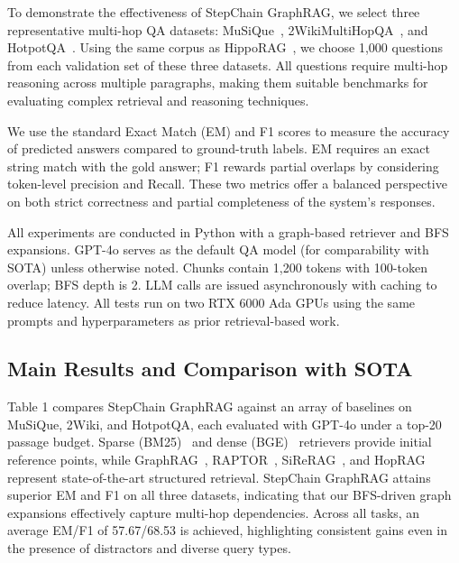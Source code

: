 \documentclass[runningheads]{llncs}
\begin{document}
To demonstrate the effectiveness of StepChain GraphRAG, we select three representative multi-hop QA datasets: MuSiQue~\cite{trivedi2022musique}, 2WikiMultiHopQA~\cite{ho2020constructing}, and HotpotQA~\cite{yang2018hotpotqa}. Using the same corpus as HippoRAG~\cite{gutierrez2024hipporag}, we choose 1,000 questions from each validation set of these three datasets. All questions require multi-hop reasoning across multiple paragraphs, making them suitable benchmarks for evaluating complex retrieval and reasoning techniques. 

We use the standard Exact Match (EM) and F1 scores to measure the accuracy of predicted answers compared to ground-truth labels. EM requires an exact string match with the gold answer; F1 rewards partial overlaps by considering token-level precision and Recall. These two metrics offer a balanced perspective on both strict correctness and partial completeness of the system's responses.

All experiments are conducted in Python with a graph-based retriever and BFS expansions. GPT-4o serves as the default QA model (for comparability with SOTA) unless otherwise noted. Chunks contain 1,200 tokens with 100-token overlap; BFS depth is 2. LLM calls are issued asynchronously with caching to reduce latency. All tests run on two RTX 6000 Ada GPUs using the same prompts and hyperparameters as 
prior retrieval-based work.~\cite{liu2025hoprag}

\subsection{Main Results and Comparison with SOTA}
Table 1 compares StepChain GraphRAG against an array of baselines on MuSiQue, 2Wiki, and HotpotQA, each evaluated with GPT-4o under a top-20 passage budget. Sparse (BM25)~\cite{robertson2009probabilistic} and dense (BGE)~\cite{karpukhin2020dense} retrievers provide initial reference points, while GraphRAG~\cite{edge2024local}, RAPTOR~\cite{sarthi2024raptor}, SiReRAG~\cite{zhang2024sirerag}, and HopRAG~\cite{liu2025hoprag} represent state-of-the-art structured retrieval. StepChain GraphRAG attains superior EM and F1 on all three datasets, indicating that our BFS-driven graph expansions effectively capture multi-hop dependencies. Across all tasks, an average EM/F1 of 57.67/68.53 is achieved, highlighting consistent gains even in the presence of distractors and diverse query types.
\end{document}

